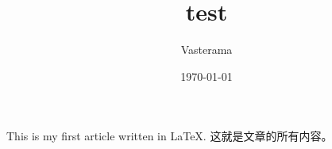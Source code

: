 \documentclass[UTF8]{ctexart}
\title{test}
\author{Vastera\textunderscore ma}
\date{\today}
\begin{document}
 
    \maketitle
    
    This is my first article written in \LaTeX.
    这就是文章的所有内容。
    ​
    
\end{document}
